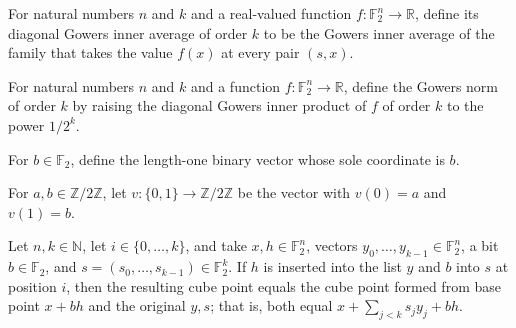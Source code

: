 \begin{definition}
\label{FABL.gowersDiagonalInner}
\leanok
{}
For natural numbers $n$ and $k$ and a real-valued function
$f\colon\mathbb{F}_2^n\to\mathbb{R}$, define its diagonal Gowers inner average of order
$k$ to be the Gowers inner average of the family that takes the value $f(x)$ at every
pair $(s,x)$.
\end{definition}

\begin{definition}
\label{FABL.gowersNorm}
\leanok
{}
For natural numbers $n$ and $k$ and a function $f\colon\mathbb{F}_2^n\to\mathbb{R}$,
define the Gowers norm of order $k$ by raising the diagonal Gowers inner product of $f$
of order $k$ to the power $1/2^k$.
\end{definition}

\begin{definition}
\label{FABL.gowersBit}
\leanok
{}
For $b\in\mathbb{F}_2$, define the length-one binary vector whose sole coordinate is
$b$.
\end{definition}

\begin{definition}
\label{FABL.gowersPair}
\leanok
{}
For $a,b\in\mathbb{Z}/2\mathbb{Z}$, let $v\colon\{0,1\}\to\mathbb{Z}/2\mathbb{Z}$ be the
vector with $v(0)=a$ and $v(1)=b$.
\end{definition}

\begin{theorem}
\label{FABL.gowersCubePoint_insertNth}
\leanok
{}
Let $n,k\in\mathbb N$, let $i\in\{0,\ldots,k\}$, and take $x,h\in\mathbb F_2^n$, vectors
$y_0,\ldots,y_{k-1}\in\mathbb F_2^n$, a bit $b\in\mathbb F_2$, and
$s=(s_0,\ldots,s_{k-1})\in\mathbb F_2^k$. If $h$ is inserted into the list $y$ and $b$
into $s$ at position $i$, then the resulting cube point equals the cube point formed
from base point $x+bh$ and the original $y,s$; that is, both equal $x+\sum_{j<k}s_jy_j+b
h$.
\end{theorem}

